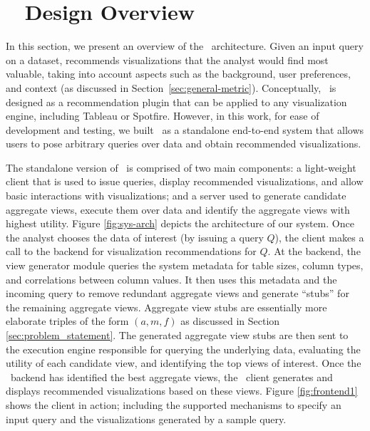 

\section{{\large \SeeDB\ } Design Overview}
\label{sec:system_architecture}

In this section, we present an overview of the \SeeDB\ architecture.
Given an input query on a dataset, 
\SeeDB recommends visualizations that the analyst would find most valuable,
taking into account aspects such as the background, user preferences,
and context (as discussed in Section~\ref{sec:general-metric}).
Conceptually, \SeeDB\ is designed as a recommendation plugin that can
be applied to any visualization engine,
including Tableau or Spotfire. 
However, in this work, for ease of development and testing, we built 
\SeeDB\ as a standalone end-to-end system that allows users to pose 
arbitrary queries over data and obtain recommended visualizations.

The standalone version of \SeeDB\ is comprised of two main components: 
a light-weight client that is 
used to issue queries, display recommended visualizations, and allow basic 
interactions with visualizations; and a server used to generate candidate
aggregate views, execute
them over data and identify the aggregate views with highest utility. 
Figure \ref{fig:sys-arch} depicts the architecture of our system.
Once the analyst chooses the data of interest (by issuing a query $Q$), the
client makes a call to the backend for visualization recommendations for $Q$.
At the backend, the view generator module queries the system metadata for table sizes, 
column types, and correlations between column values. 
It then uses this metadata and the incoming query to remove redundant aggregate views and generate ``stubs'' for the remaining aggregate views. 
Aggregate view stubs are essentially more elaborate triples of the form $(a, m, f)$ as
discussed in Section \ref{sec:problem_statement}. 
The generated aggregate view stubs are then sent to the execution engine
responsible for querying the underlying data, evaluating the utility of each
candidate view, and identifying the top views of interest. 
Once the \SeeDB\ backend has identified the best aggregate views, the \SeeDB\
client generates and displays recommended visualizations based on these views.
Figure \ref{fig:frontend1} shows the \SeeDB client in action; including the supported mechanisms to specify an input query 
and the visualizations generated by a sample query. 

